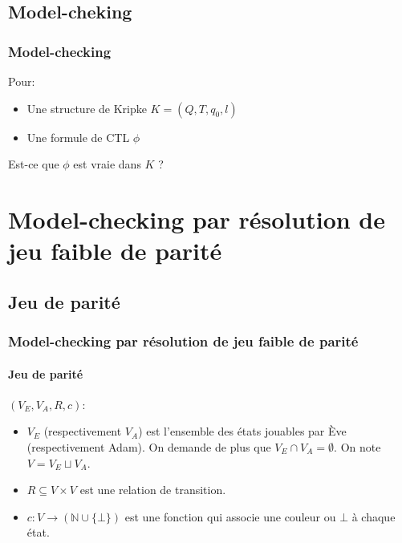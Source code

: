 \documentclass[11pt]{beamer}
\begin{document}
\subsection{Model-cheking}
\begin{frame}
\frametitle{Model-checking}
Pour:
\begin{itemize}
	\item Une structure de Kripke $K = (Q,T, q_0, l)$
	\item Une formule de CTL $\phi$
\end{itemize}
Est-ce que $\phi$ est vraie dans $K$ ?
\end{frame}


\section{Model-checking par résolution de jeu faible de parité}
\subsection{Jeu de parité}
\begin{frame}
	\frametitle{Model-checking par résolution de jeu faible de parité}
    \framesubtitle{Jeu de parité}

    $(V_E, V_A, R, c)$:
    \begin{itemize}
        \item $V_E$ (respectivement $V_A$) est l'ensemble des états jouables par Ève (respectivement Adam). On demande de plus que $V_E \cap V_A = \emptyset$. On note $V = V_E \sqcup V_A$.
        \item $R \subseteq V \times V$ est une relation de transition.
        \item $c : V \to (\mathbb{N} \cup \{\bot\})$ est une fonction qui associe une couleur ou $\bot$ à chaque état.
    \end{itemize}
\end{frame}
\end{document}
